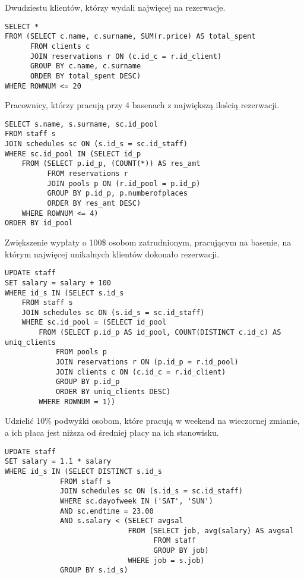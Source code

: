 \documentclass[a4paper]{article}
\newcounter{subsubsubsection}[subsubsection]
\begin{document}
\noindent
Dwudziestu klientów, którzy wydali najwięcej na rezerwacje.

\begin{verbatim}
SELECT *
FROM (SELECT c.name, c.surname, SUM(r.price) AS total_spent
      FROM clients c
      JOIN reservations r ON (c.id_c = r.id_client)
      GROUP BY c.name, c.surname
      ORDER BY total_spent DESC)
WHERE ROWNUM <= 20
\end{verbatim}

\noindent
Pracownicy, którzy pracują przy 4 basenach z największą ilością rezerwacji.

\begin{verbatim}
SELECT s.name, s.surname, sc.id_pool
FROM staff s
JOIN schedules sc ON (s.id_s = sc.id_staff)
WHERE sc.id_pool IN (SELECT id_p
    FROM (SELECT p.id_p, (COUNT(*)) AS res_amt
          FROM reservations r
          JOIN pools p ON (r.id_pool = p.id_p)
          GROUP BY p.id_p, p.numberofplaces
          ORDER BY res_amt DESC)
    WHERE ROWNUM <= 4)
ORDER BY id_pool
\end{verbatim}

\newpage


Zwiększenie wypłaty o 100\$ osobom zatrudnionym, pracującym na basenie, na którym najwięcej unikalnych klientów dokonało rezerwacji.

\begin{verbatim}
UPDATE staff
SET salary = salary + 100
WHERE id_s IN (SELECT s.id_s
    FROM staff s
    JOIN schedules sc ON (s.id_s = sc.id_staff)
    WHERE sc.id_pool = (SELECT id_pool
        FROM (SELECT p.id_p AS id_pool, COUNT(DISTINCT c.id_c) AS uniq_clients
            FROM pools p
            JOIN reservations r ON (p.id_p = r.id_pool)
            JOIN clients c ON (c.id_c = r.id_client)
            GROUP BY p.id_p
            ORDER BY uniq_clients DESC)
        WHERE ROWNUM = 1))
\end{verbatim}

\noindent
Udzielić 10\% podwyżki osobom, które pracują w weekend na wieczornej zmianie, a ich płaca jest niższa od średniej płacy na ich stanowisku.

\begin{verbatim}
UPDATE staff
SET salary = 1.1 * salary
WHERE id_s IN (SELECT DISTINCT s.id_s
             FROM staff s
             JOIN schedules sc ON (s.id_s = sc.id_staff)
             WHERE sc.dayofweek IN ('SAT', 'SUN')
             AND sc.endtime = 23.00
             AND s.salary < (SELECT avgsal
                             FROM (SELECT job, avg(salary) AS avgsal
                                   FROM staff
                                   GROUP BY job)
                             WHERE job = s.job)
             GROUP BY s.id_s)
\end{verbatim}
\end{document}
